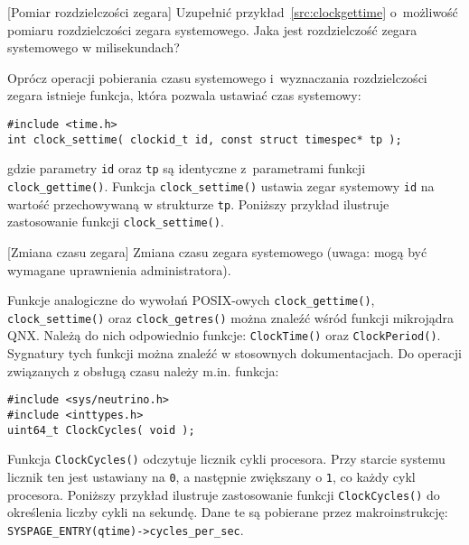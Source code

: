 \begin{example}{[Pomiar rozdzielczości zegara]}
Uzupełnić przykład~\ref{src:clockgettime} o~możliwość pomiaru rozdzielczości zegara systemowego. Jaka jest rozdzielczość zegara systemowego w milisekundach?
\end{example}

Oprócz operacji pobierania czasu systemowego i~wyznaczania rozdzielczości zegara istnieje funkcja, która pozwala ustawiać czas systemowy:

\begin{lstlisting}[style=MyCStyle]
#include <time.h>
int clock_settime( clockid_t id, const struct timespec* tp );
\end{lstlisting}

gdzie parametry \lstinline[style=MyCStyle]{id} oraz \lstinline[style=MyCStyle]{tp} są identyczne z~parametrami funkcji \lstinline[style=MyCStyle]{clock_gettime()}. Funkcja \lstinline[style=MyCStyle]{clock_settime()} ustawia zegar systemowy \lstinline[style=MyCStyle]{id} na wartość przechowywaną w strukturze \lstinline[style=MyCStyle]{tp}. Poniższy przykład ilustruje zastosowanie funkcji \lstinline[style=MyCStyle]{clock_settime()}.

\begin{example}{[Zmiana czasu zegara]} Zmiana czasu zegara systemowego (uwaga: mogą być wymagane uprawnienia administratora).

\end{example}

Funkcje analogiczne do wywołań POSIX-owych \lstinline[style=MyCStyle]{clock_gettime()}, \lstinline[style=MyCStyle]{clock_settime()} oraz \lstinline[style=MyCStyle]{clock_getres()} można znaleźć wśród funkcji mikrojądra QNX. Należą do nich odpowiednio funkcje: \lstinline[style=MyCStyle]{ClockTime()} oraz \lstinline[style=MyCStyle]{ClockPeriod()}. Sygnatury tych funkcji można znaleźć w stosownych dokumentacjach.  Do operacji związanych z obsługą czasu należy m.in. funkcja:

\begin{lstlisting}[style=MyCStyle]
#include <sys/neutrino.h>
#include <inttypes.h>
uint64_t ClockCycles( void );
\end{lstlisting}

Funkcja \lstinline[style=MyCStyle]{ClockCycles()} odczytuje licznik cykli procesora. Przy starcie systemu licznik ten jest ustawiany na \lstinline[style=MyCStyle]{0}, a następnie zwiększany o \lstinline[style=MyCStyle]{1}, co każdy cykl procesora. Poniższy przykład ilustruje zastosowanie funkcji \lstinline[style=MyCStyle]{ClockCycles()} do określenia liczby cykli na sekundę. Dane te są pobierane przez makroinstrukcję: \lstinline[style=MyCStyle]{SYSPAGE_ENTRY(qtime)->cycles_per_sec}.

